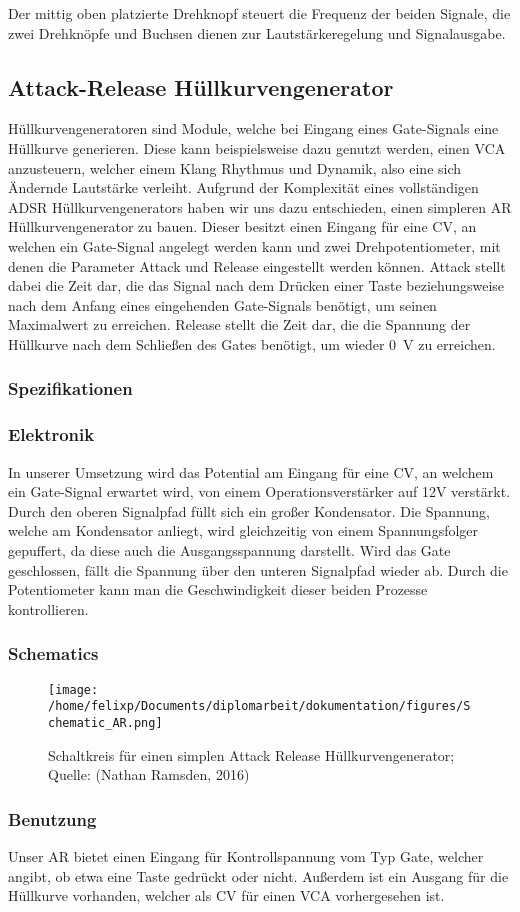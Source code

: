 Der mittig oben platzierte Drehknopf steuert die Frequenz der beiden Signale, die zwei Drehknöpfe und Buchsen dienen zur Lautstärkeregelung und Signalausgabe.
\subsection{Attack-Release Hüllkurvengenerator \label{AR}}
\label{sec:org808f67b}
Hüllkurvengeneratoren sind Module, welche bei Eingang eines Gate-Signals eine Hüllkurve generieren. Diese kann beispielsweise dazu genutzt werden, einen \ac{VCA} anzusteuern, welcher einem Klang Rhythmus und Dynamik, also eine sich Ändernde Lautstärke verleiht. Aufgrund der Komplexität eines vollständigen \ac{ADSR} Hüllkurvengenerators haben wir uns dazu entschieden, einen simpleren \ac{AR} Hüllkurvengenerator zu bauen. Dieser besitzt einen Eingang für eine \acl{CV}, an welchen ein Gate-Signal angelegt werden kann und zwei Drehpotentiometer, mit denen die Parameter Attack und Release eingestellt werden können. Attack stellt dabei die Zeit dar, die das Signal nach dem Drücken einer Taste beziehungsweise nach dem Anfang eines eingehenden Gate-Signals benötigt, um seinen Maximalwert zu erreichen. Release stellt die Zeit dar, die die Spannung der Hüllkurve nach dem Schließen des Gates benötigt, um wieder \SI{0}{\volt} zu erreichen.

\subsubsection{Spezifikationen}
\label{sec:orgc511441}
\subsubsection{Elektronik}
\label{sec:orgd7a8a64}
In unserer Umsetzung wird das Potential am Eingang für eine \acl{CV}, an welchem ein Gate-Signal erwartet wird, von einem Operationsverstärker auf 12V verstärkt. Durch den oberen Signalpfad füllt sich ein großer Kondensator. Die Spannung, welche am Kondensator anliegt, wird gleichzeitig von einem Spannungsfolger gepuffert, da diese auch die Ausgangsspannung darstellt. Wird das Gate geschlossen, fällt die Spannung über den unteren Signalpfad wieder ab. Durch die Potentiometer kann man die Geschwindigkeit dieser beiden Prozesse kontrollieren.
\subsubsection{Schematics}
\label{sec:org2466124}
\begin{figure}[htbp]
\centering
\texttt{[image: /home/felixp/Documents/diplomarbeit/dokumentation/figures/Schematic\_AR.png]}
\caption{Schaltkreis für einen simplen Attack Release Hüllkurvengenerator; Quelle: (Nathan Ramsden, 2016)}
\end{figure}
\subsubsection{Benutzung}
\label{sec:org16aeac1}
Unser AR bietet einen Eingang für Kontrollspannung vom Typ Gate, welcher angibt, ob etwa eine Taste gedrückt oder nicht. Außerdem ist ein Ausgang für die Hüllkurve vorhanden, welcher als \acl{CV} für einen \ac{VCA} vorhergesehen ist.
